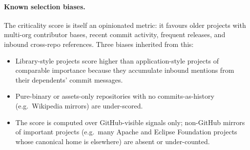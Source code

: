\paragraph{Known selection biases.} The criticality score is itself an
opinionated metric: it favours older projects with multi-org contributor
bases, recent commit activity, frequent releases, and inbound cross-repo
references. Three biases inherited from this:
\begin{itemize}
\item Library-style projects score higher than application-style projects
of comparable importance because they accumulate inbound mentions from
their dependents' commit messages.
\item Pure-binary or assets-only repositories with no commits-as-history
(e.g.\ Wikipedia mirrors) are under-scored.
\item The score is computed over GitHub-visible signals only; non-GitHub
mirrors of important projects (e.g.\ many Apache and Eclipse Foundation
projects whose canonical home is elsewhere) are absent or under-counted.
\end{itemize}
